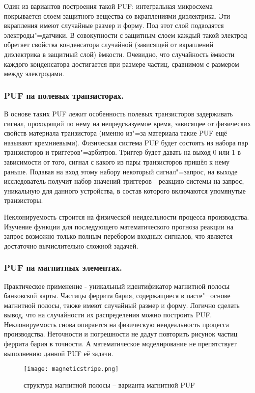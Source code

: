 Один из вариантов построения такой PUF: интегральная микросхема покрывается слоем защитного вещества со вкраплениями диэлектрика. Эти вкрапления имеют случайные размер и форму. Под этот слой подводятся электроды"=датчики. В совокупности с защитным слоем каждый такой электрод обретает свойства конденсатора случайной (зависящей от вкраплений диэлектрика в защитный слой) ёмкости. Очевидно, что случайность ёмкости каждого конденсатора достигается при размере частиц, сравнимом с размером между электродами.


\subsubsection{PUF на полевых транзисторах. }
\label{sub:domain:puf_physical_types:transistors}

В основе таких PUF лежит особенность полевых транзисторов задерживать сигнал, проходящий по нему на непредсказуемое время, зависящее от физических свойств материала транзистора (именно из"=за материала такие PUF ещё называют кремниевыми). Физическая система PUF будет состоять из набора пар транзисторов и триггеров"=арбитров. Триггер будет давать на выход 0 или 1 в зависимости от того, сигнал с какого из пары транзисторов пришёл к нему раньше. Подавая на вход этому набору некоторый сигнал"=запрос, на выходе исследователь получит набор значений триггеров - реакцию системы на запрос, уникальную для данного устройства, в состав которого включаются упомянутые транзисторы.

Неклонируемость строится на физической неидеальности процесса производства. Изучение функции для последующего математического прогноза реакции на запрос возможно только полным перебором входных сигналов, что является достаточно вычислительно сложной задачей.


\subsubsection{PUF на магнитных элементах. }
\label{sub:domain:puf_physical_types:magnetic}

Практическое применение - уникальный идентификатор магнитной полосы банковской карты. Частицы феррита бария, содержащиеся в пасте"=основе магнитной полосы, также имеют случайный размер и форму. Логично сделать вывод, что на случайности их распределения можно построить PUF. Неклонируемость снова опирается на физическую неидеальность процесса производства. Неточности и погрешности не дадут повторить рисунок частиц феррита бария в  точности. А математическое моделирование не препятствует выполнению данной PUF её задачи.
\begin{figure}[ht]
    \centering
    \label{fig:domain:puf_physical_types:magnetic}
    \texttt{[image: magneticstripe.png]}
    \caption{структура магнитной полосы -- варианта магнитной PUF}
\end{figure}

